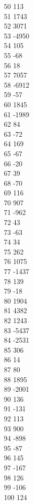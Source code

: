 { 50	113 \\
 51	1743 \\
 52	3071 \\
 53	-4950 \\
 54	105 \\
 55	-68 \\
 56	18 \\
 57	7057 \\
 58	-6912 \\
 59	-57 \\
 60	1845 \\
 61	-1989 \\
 62	84 \\
 63	-72 \\
 64	169 \\
 65	-67 \\
 66	-20 \\
 67	39 \\
 68	-70 \\
 69	116 \\
 70	907 \\
 71	-962 \\
 72	43 \\
 73	-63 \\
 74	34 \\
 75	262 \\
 76	1075 \\
 77	-1437 \\
 78	139 \\
 79	-18 \\
 80	1904 \\
 81	4382 \\
 82	1243 \\
 83	-5437 \\
 84	-2531 \\
 85	306 \\
 86	14 \\
 87	80 \\
 88	1895 \\
 89	-2001 \\
 90	136 \\
 91	-131 \\
 92	113 \\
 93	900 \\
 94	-898 \\
 95	-87 \\
 96	145 \\
 97	-167 \\
 98	126 \\
 99	-106 \\
 100	124 \\
}
